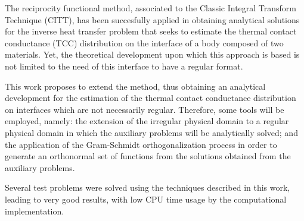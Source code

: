 \documentclass[msc,numbers, fleqn]{coppe}
\numberwithin{figure}{section}
\numberwithin{table}{section}
\numberwithin{equation}{section}
\begin{document}
  \begin{foreignabstract}

The reciprocity functional method, associated to the Classic Integral Transform Technique (CITT), has been succesfully applied in obtaining analytical
solutions for the inverse heat transfer problem that seeks to estimate the thermal contact conductance (TCC) distribution on the interface of a body composed of
two materials. Yet, the theoretical development upon which this approach is based is not limited to the need of this interface to have a regular format.

This work proposes to extend the method, thus obtaining an analytical development for the estimation of the thermal contact conductance distribution on interfaces which
are not necessarily regular. Therefore, some tools will be employed, namely: the extension of the irregular physical domain to a regular physical domain in
which the auxiliary problems will be analytically solved; and the application of the Gram-Schmidt orthogonalization process in order to generate an orthonormal set
of functions from the solutions obtained from the auxiliary problems.

Several test problems were solved using the techniques described in this work, leading to very good results, with low CPU time usage by the computational implementation.
 
  \end{foreignabstract}

\tableofcontents
 \listoffigures
 \listoftables
 \printlosymbols
 \printloabbreviations

  \mainmatter
  
















\newpage

\backmatter  


\appendix

%
\end{document}
